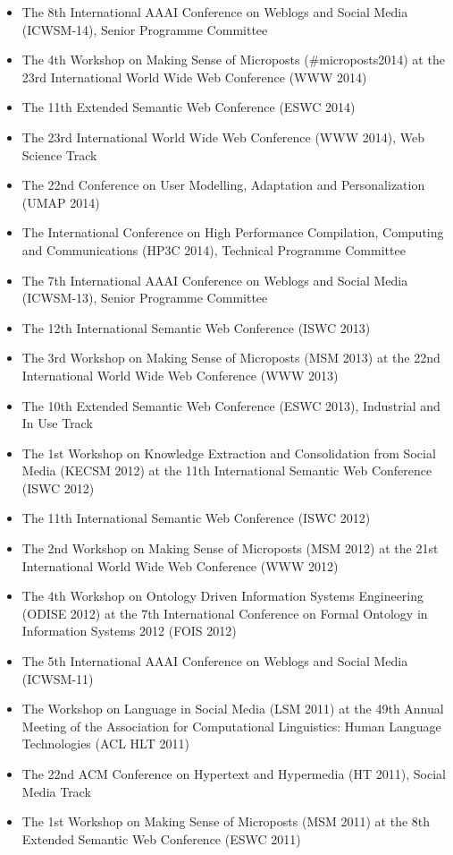 \documentclass[10pt,a4paper]{res} %
\begin{document}
\begin{resume}
\begin{itemize}
\item The 8th International AAAI Conference on Weblogs and Social Media (ICWSM-14), Senior Programme Committee
\item The 4th Workshop on Making Sense of Microposts (\#microposts2014) at the 23rd International World Wide Web Conference (WWW 2014)
\item The 11th Extended Semantic Web Conference (ESWC 2014)
\item The 23rd International World Wide Web Conference (WWW 2014), Web Science Track
\item The 22nd Conference on User Modelling, Adaptation and Personalization (UMAP 2014)
\item The International Conference on High Performance Compilation, Computing and Communications (HP3C 2014), Technical Programme Committee
\item The 7th International AAAI Conference on Weblogs and Social Media (ICWSM-13), Senior Programme Committee
\item The 12th International Semantic Web Conference (ISWC 2013)
\item The 3rd Workshop on Making Sense of Microposts (MSM 2013) at the 22nd International World Wide Web Conference (WWW 2013)
\item The 10th Extended Semantic Web Conference (ESWC 2013), Industrial and In Use Track
\item The 1st Workshop on Knowledge Extraction and Consolidation from Social Media (KECSM 2012) at the 11th International Semantic Web Conference (ISWC 2012)
\item The 11th International Semantic Web Conference (ISWC 2012)
\item The 2nd Workshop on Making Sense of Microposts (MSM 2012) at the 21st International World Wide Web Conference (WWW 2012)
\item The 4th Workshop on Ontology Driven Information Systems Engineering (ODISE 2012) at the 7th International Conference on Formal Ontology in Information Systems 2012 (FOIS 2012)
\item The 5th International AAAI Conference on Weblogs and Social Media (ICWSM-11)
\item The Workshop on Language in Social Media (LSM 2011) at the 49th Annual Meeting of the Association for Computational Linguistics: Human Language Technologies (ACL HLT 2011)
\item The 22nd ACM Conference on Hypertext and Hypermedia (HT 2011), Social Media Track
\item The 1st Workshop on Making Sense of Microposts (MSM 2011) at the 8th Extended Semantic Web Conference (ESWC 2011)

\end{itemize}
\end{resume}
\end{document}
